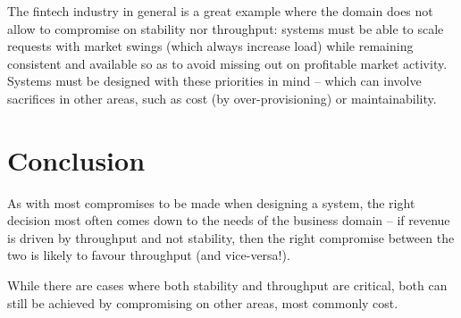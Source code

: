 \documentclass[conference]{IEEEtran}
\begin{document}
    The fintech industry in general is a great example where the domain does not allow to compromise on stability nor throughput: systems must be able to scale requests with market swings (which always increase load) while remaining consistent and available so as to avoid missing out on profitable market activity.
    Systems must be designed with these priorities in mind -- which can involve sacrifices in other areas, such as cost (by over-provisioning) or maintainability.


    \section{Conclusion}

    As with most compromises to be made when designing a system, the right decision most often comes down to the needs of the business domain -- if revenue is driven by throughput and not stability, then the right compromise between the two is likely to favour throughput (and vice-versa!).

    While there are cases where both stability and throughput are critical, both can still be achieved by compromising on other areas, most commonly cost.
    \newpage

    \printbibliography
\end{document}
